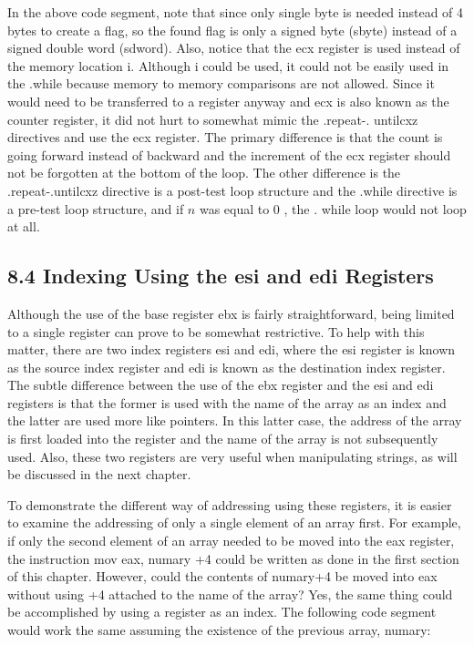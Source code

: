 \documentclass[10pt]{book}
\begin{document}
\begin{center}
\begin{center}
In the above code segment, note that since only single byte is needed instead of 4 bytes to create a flag, so the found flag is only a signed byte (sbyte) instead of a signed double word (sdword). Also, notice that the ecx register is used instead of the memory location i. Although i could be used, it could not be easily used in the .while because memory to memory comparisons are not allowed. Since it would need to be transferred to a register anyway and ecx is also known as the counter register, it did not hurt to somewhat mimic the .repeat-. untilcxz directives and use the ecx register. The primary difference is that the count is going forward instead of backward and the increment of the ecx register should not be forgotten at the bottom of the loop. The other difference is the .repeat-.untilcxz directive is a post-test loop structure and the .while directive is a pre-test loop structure, and if $n$ was equal to 0 , the . while loop would not loop at all.

\subsection*{8.4 Indexing Using the esi and edi Registers}
Although the use of the base register ebx is fairly straightforward, being limited to a single register can prove to be somewhat restrictive. To help with this matter, there are two index registers esi and edi, where the esi register is known as the source index register and edi is known as the destination index register. The subtle difference between the use of the ebx register and the esi and edi registers is that the former is used with the name of the array as an index and the latter are used more like pointers. In this latter case, the address of the array is first loaded into the register and the name of the array is not subsequently used. Also, these two registers are very useful when manipulating strings, as will be discussed in the next chapter.


To demonstrate the different way of addressing using these registers, it is easier to examine the addressing of only a single element of an array first. For example, if only the second element of an array needed to be moved into the eax register, the instruction mov eax, numary +4 could be written as done in the first section of this chapter. However, could the contents of numary+4 be moved into eax without using +4 attached to the name of the array? Yes, the same thing could be accomplished by using a register as an index. The following code segment would work the same assuming the existence of the previous array, numary:


\end{center}
\end{center}
\end{document}
